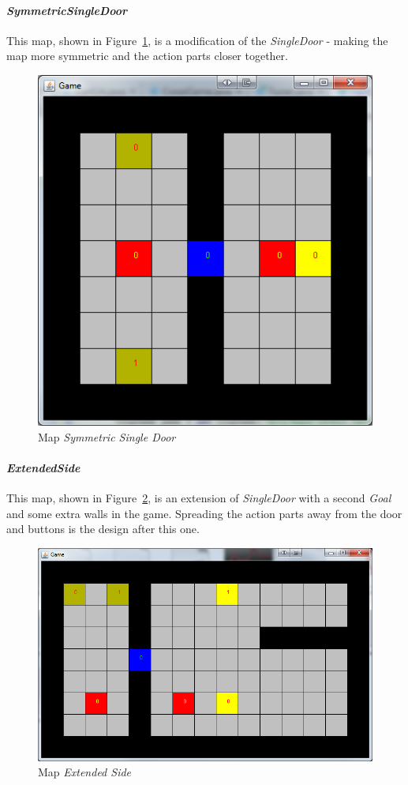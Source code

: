 \documentclass{IEEEtran}
\begin{document}
\paragraph{\emph{SymmetricSingleDoor}} This map, shown in Figure~\ref{SymmetricSingleDoor}, is a modification of the \emph{SingleDoor} - making the map more symmetric and the action parts closer together.
\begin{figure}[!t]
\centering
\includegraphics[scale=0.35]{level2}
\caption{Map \textit{Symmetric Single Door}}
\label{SymmetricSingleDoor}
\end{figure}


\paragraph{\emph{ExtendedSide}} This map, shown in Figure~\ref{ExtendedSide}, is an extension of \emph{SingleDoor} with a second \emph{Goal} and some extra walls in the game. Spreading the action parts away from the door and buttons is the design after this one.
\begin{figure}[!t]
\centering
\includegraphics[scale=0.35]{level3}
\caption{Map \textit{Extended Side}}
\label{ExtendedSide}
\end{figure}
\end{document}
